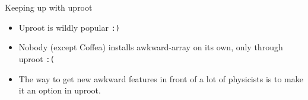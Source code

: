 \documentclass[aspectratio=169]{beamer}
\begin{document}
\begin{frame}{Keeping up with uproot}
\vspace{0.5 cm}


\begin{itemize}
\item Uproot is wildly popular {\tt:)}
\item Nobody (except Coffea) installs awkward-array on its own, only through uproot {\tt:(}
\item The way to get new awkward features in front of a lot of physicists is to make it an option in uproot.
\end{itemize}
\end{frame}
\end{document}
